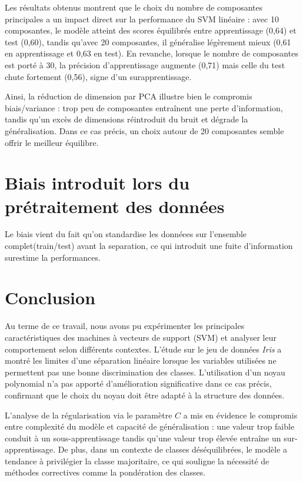 \documentclass{rapport}
\begin{document}
Les résultats obtenus montrent que le choix du nombre de composantes principales a un impact direct sur la performance du SVM linéaire : avec 10 composantes, le modèle atteint des scores équilibrés entre apprentissage (0,64) et test (0,60), tandis qu’avec 20 composantes, il généralise légèrement mieux (0,61 en apprentissage et 0,63 en test). En revanche, lorsque le nombre de composantes est porté à 30, la précision d’apprentissage augmente (0,71) mais celle du test chute fortement (0,56), signe d’un surapprentissage.

Ainsi, la réduction de dimension par PCA illustre bien le compromis biais/variance : trop peu de composantes entraînent une perte d’information, tandis qu’un excès de dimensions réintroduit du bruit et dégrade la généralisation. Dans ce cas précis, un choix autour de 20 composantes semble offrir le meilleur équilibre.

\section{Biais introduit lors du prétraitement des données}

Le biais vient du fait qu'on standardise les donnéees sur l'ensemble complet(train/test) avant la separation, ce qui introduit une fuite d'information surestime la performances.


\section*{Conclusion}

Au terme de ce travail, nous avons pu expérimenter les principales caractéristiques
des machines à vecteurs de support (SVM) et analyser leur comportement selon
différents contextes. L’étude sur le jeu de données \emph{Iris} a montré les limites
d’une séparation linéaire lorsque les variables utilisées ne permettent pas une bonne
discrimination des classes. L’utilisation d’un noyau polynomial n’a pas apporté
d’amélioration significative dans ce cas précis, confirmant que le choix du noyau
doit être adapté à la structure des données.  

L’analyse de la régularisation via le paramètre $C$ a mis en évidence le compromis
entre complexité du modèle et capacité de généralisation : une valeur trop faible
conduit à un sous-apprentissage tandis qu’une valeur trop élevée entraîne un
sur-apprentissage. De plus, dans un contexte de classes déséquilibrées, le modèle
a tendance à privilégier la classe majoritaire, ce qui souligne la nécessité de
méthodes correctives comme la pondération des classes.  
\end{document}
